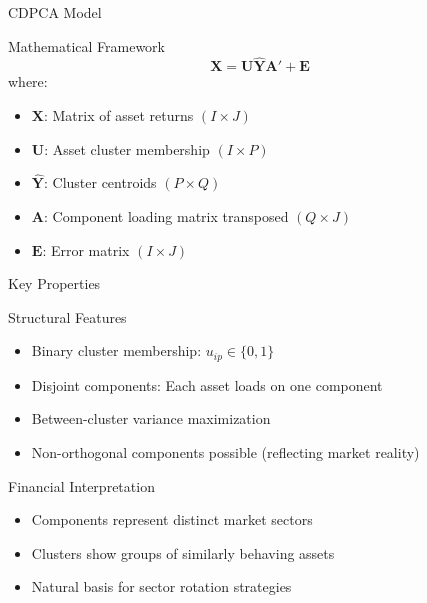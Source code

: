 \documentclass{beamer}
\begin{document}
\begin{frame}{CDPCA Model}
    \begin{block}{Mathematical Framework}
        \begin{equation*}
            \mathbf{X} = \mathbf{U}\hat{\mathbf{Y}}\mathbf{A}' + \mathbf{E}
        \end{equation*}
        where:
        \begin{itemize}
            \item $\mathbf{X}$: Matrix of asset returns $(I \times J)$
            \item $\mathbf{U}$: Asset cluster membership $(I \times P)$
            \item $\hat{\mathbf{Y}}$: Cluster centroids $(P \times Q)$
            \item $\mathbf{A}$: Component loading matrix transposed $(Q \times J)$
            \item $\mathbf{E}$: Error matrix $(I \times J)$
        \end{itemize}
    \end{block}
\end{frame}

\begin{frame}{Key Properties}
    \begin{block}{Structural Features}
        \begin{itemize}
            \item Binary cluster membership: $u_{ip} \in \{0,1\}$
            \item Disjoint components: Each asset loads on one component
            \item Between-cluster variance maximization
            \item Non-orthogonal components possible (reflecting market reality)
        \end{itemize}
    \end{block}

    \begin{block}{Financial Interpretation}
        \begin{itemize}
            \item Components represent distinct market sectors
            \item Clusters show groups of similarly behaving assets
            \item Natural basis for sector rotation strategies
        \end{itemize}
    \end{block}
\end{frame}
\end{document}
